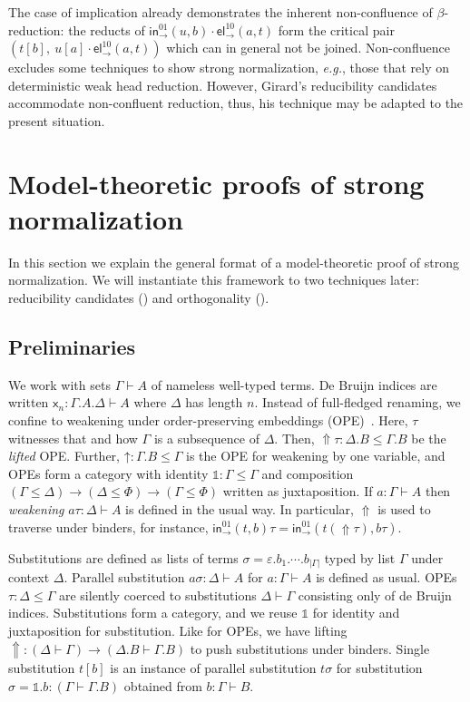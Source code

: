 \documentclass[a4paper,USenglish,cleveref, autoref, thm-restate]{lipics-v2019}
\newcommand{\eg}{\emph{e.g.}\xspace}
\newcommand{\sid}{\mathds{1}}
\newcommand{\Ge}{\ensuremath{\varepsilon}}
\newcommand{\x}{\mathsf{x}}
\newcommand{\tin}{\ensuremath{\mathsf{in}}}
\newcommand{\inn}[2]{\ensuremath{\tin_{#1}^{#2}}}
\newcommand{\tel}{\mathsf{el}}
\newcommand{\el}[2]{\ensuremath{\tel_{#1}^{#2}}}
\newcommand{\Up}{\mathop{\Uparrow}}
\newcommand{\up}{\mathord{\uparrow}}
\begin{document}
The case of implication already demonstrates the inherent
non-confluence of $\beta$-reduction: the reducts of
$\inn\to{01}(u,b) \cdot \el\to{10}(a,t)$ form the critical pair
$(t[b],\ u[a] \cdot \el\to{10}(a,t))$ which can in general not be
joined.  Non-confluence excludes some techniques to show strong
normalization, \eg, those that rely on deterministic weak head
reduction.  However, Girard's reducibility candidates accommodate
non-confluent reduction, thus, his technique may be adapted to the
present situation.

\section{Model-theoretic proofs of strong normalization}
\label{sec:model}

In this section we explain the general format of a model-theoretic
proof of strong normalization.  We will instantiate this framework to two techniques later: reducibility candidates () and orthogonality ().

\subsection{Preliminaries}
\label{sec:prelim}

We work with sets $\Gamma \vdash A$ of nameless well-typed terms.
De Bruijn indices are written $\x_n : \Gamma.A.\Delta \vdash A$ where
$\Delta$ has length $n$.
Instead of full-fledged renaming, we confine to
weakening under order-preserving embeddings (OPE)
\fbox{$\tau : \Delta \leq \Gamma$}\,.  Here, $\tau$ witnesses that and how
$\Gamma$ is a subsequence of $\Delta$.
Then, $\Up\tau : \Delta.B \leq \Gamma.B$ be the \emph{lifted} OPE.
Further, $\up : \Gamma.B \leq \Gamma$ is the OPE for weakening by one
variable, and OPEs form a category with identity $\sid : \Gamma \leq
\Gamma$ and composition %
$(\Gamma \leq \Delta) \to (\Delta \leq \Phi) \to (\Gamma \leq \Phi)$
written as juxtaposition.
If $a : \Gamma \vdash A$ then
\emph{weakening} $a\tau : \Delta \vdash A$ is defined in the usual way.
In particular, $\Up$ is used to traverse under binders, for instance,
$\inn\to{01}(t,b)\tau = \inn\to{01}(t(\Up\tau),b\tau)$.

Substitutions \fbox{$\sigma : \Delta \vdash \Gamma$} are defined as lists of
terms $\sigma = \Ge.b_1.\cdots.b_{|\Gamma|}$
typed by list $\Gamma$ under context $\Delta$.  Parallel
substitution $a\sigma : \Delta \vdash A$ for $a : \Gamma \vdash A$ is
defined as usual.  OPEs $\tau : \Delta \leq \Gamma$ are silently
coerced to substitutions $\Delta \vdash \Gamma$ consisting only of de
Bruijn indices.
Substitutions form a category, and we reuse $\sid$ for
identity and %
juxtaposition for substitution.
Like for OPEs, we have lifting
$\Up : (\Delta \vdash \Gamma) \to (\Delta.B \vdash \Gamma.B)$ to push
substitutions under binders.
%
Single substitution $t[b]$ is
an instance of parallel substitution $t\sigma$ for substitution
$\sigma = \sid.b : (\Gamma \vdash \Gamma.B)$ obtained from $b : \Gamma \vdash B$.
\end{document}
